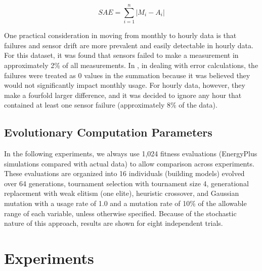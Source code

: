 \documentclass[preprint, review, 12pt]{elsarticle}
\begin{document}
\begin{equation}
\label{eq:sae}
	SAE = \sum_{i=1}^{n}\left|M_i - A_i\right|
\end{equation}

One practical consideration in moving from monthly to hourly data is that failures and sensor drift are more prevalent and easily detectable in hourly data. For this dataset, it was found that sensors failed to make a measurement in approximately 2\% of all measurements. In \cite{cit:garrett2013}, in dealing with error calculations, the failures were treated as 0 values in the summation because it was believed they would not significantly impact monthly usage. For hourly data, however, they make a fourfold larger difference, and it was decided to ignore any hour that contained at least one sensor failure (approximately 8\% of the data).

\subsection{Evolutionary Computation Parameters}
In the following experiments, we always use 1,024 fitness evaluations (EnergyPlus simulations compared with actual data) to allow comparison across experiments. These evaluations are organized into 16 individuals (building models) evolved over 64 generations, tournament selection with tournament size 4, generational replacement with weak elitism (one elite), heuristic crossover, and Gaussian mutation with a usage rate of 1.0 and a mutation rate of 10\% of the allowable range of each variable, unless otherwise specified. Because of the stochastic nature of this approach, results are shown for eight independent trials.



\section{Experiments}
\label{sec:hourly}
\end{document}
